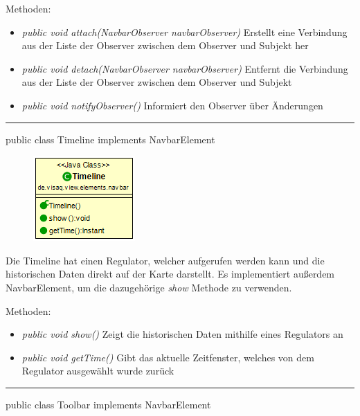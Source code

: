 Methoden:
\begin{itemize}
    \item \emph{public void attach(NavbarObserver navbarObserver)} Erstellt eine Verbindung aus der Liste der Observer zwischen dem Observer und Subjekt her
    \item \emph{public void detach(NavbarObserver navbarObserver)} Entfernt die Verbindung aus der Liste der Observer zwischen dem Observer und Subjekt
    \item \emph{public void notifyObserver()} Informiert den Observer über Änderungen
\end{itemize}

\clearpage %
\rule{\textwidth}{0.4pt}
public class Timeline implements NavbarElement

\begin{minipage}{0.3\textwidth}
    \begin{figure}[H]
        \includegraphics[scale = 0.7]{media/frontend/view/de.view.elements.navbar/TimelineClass.png}
    \end{figure}
    \end{minipage} \hfill
\begin{minipage}{0.6\textwidth}
Die Timeline hat einen Regulator, welcher aufgerufen werden kann und die historischen Daten direkt auf der Karte darstellt. Es implementiert außerdem NavbarElement, um die dazugehörige \emph{show} Methode zu verwenden.
\end{minipage}

Methoden:
\begin{itemize}
    \item \emph{public void show()} Zeigt die historischen Daten mithilfe eines Regulators an
    \item \emph{public void getTime()} Gibt das aktuelle Zeitfenster, welches von dem Regulator ausgewählt wurde zurück
\end{itemize}

\rule{\textwidth}{0.4pt}
public class Toolbar implements NavbarElement


